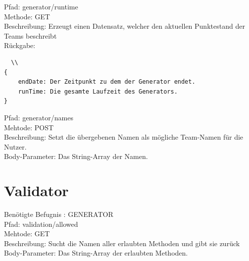 \noindent Pfad: generator/runtime \\
Methode: GET \\
Beschreibung: Erzeugt einen Datensatz, welcher den aktuellen Punktestand der Teams beschreibt  \\
Rückgabe:
\begin{lstlisting}  \\
{
	endDate: Der Zeitpunkt zu dem der Generator endet.
	runTime: Die gesamte Laufzeit des Generators.
}
\end{lstlisting}

\noindent Pfad: generator/names \\
Mehtode: POST \\
Beschreibung: Setzt die übergebenen Namen als mögliche Team-Namen für die Nutzer.\\
Body-Parameter: Das String-Array der Namen. \\


\section{Validator}

Benötigte Befugnis : GENERATOR \\

\noindent Pfad: validation/allowed\\
Mehtode: GET \\
Beschreibung: Sucht die Namen aller erlaubten Methoden und gibt sie zurück\\
Body-Parameter: Das String-Array der erlaubten Methoden. \\



